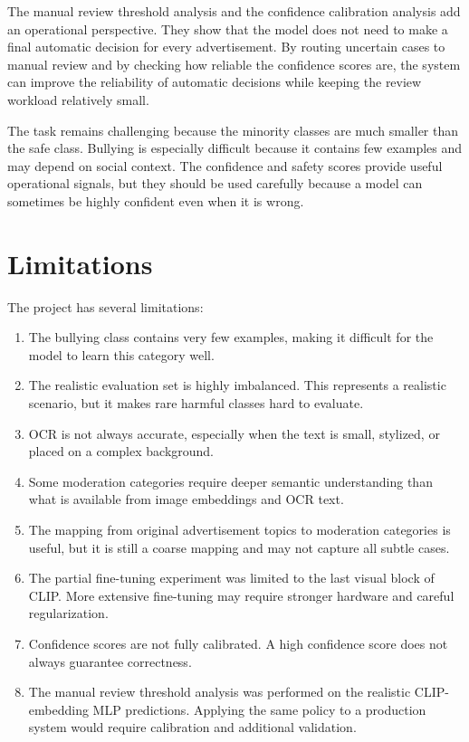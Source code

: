 \documentclass[12pt]{article}
\begin{document}
The manual review threshold analysis and the confidence calibration analysis add an operational perspective. They show that the model does not need to make a final automatic decision for every advertisement. By routing uncertain cases to manual review and by checking how reliable the confidence scores are, the system can improve the reliability of automatic decisions while keeping the review workload relatively small.

The task remains challenging because the minority classes are much smaller than the safe class. Bullying is especially difficult because it contains few examples and may depend on social context. The confidence and safety scores provide useful operational signals, but they should be used carefully because a model can sometimes be highly confident even when it is wrong.

\section{Limitations}

The project has several limitations:
\begin{enumerate}
    \item The bullying class contains very few examples, making it difficult for the model to learn this category well.
    \item The realistic evaluation set is highly imbalanced. This represents a realistic scenario, but it makes rare harmful classes hard to evaluate.
    \item OCR is not always accurate, especially when the text is small, stylized, or placed on a complex background.
    \item Some moderation categories require deeper semantic understanding than what is available from image embeddings and OCR text.
    \item The mapping from original advertisement topics to moderation categories is useful, but it is still a coarse mapping and may not capture all subtle cases.
    \item The partial fine-tuning experiment was limited to the last visual block of CLIP. More extensive fine-tuning may require stronger hardware and careful regularization.
    \item Confidence scores are not fully calibrated. A high confidence score does not always guarantee correctness.
    \item The manual review threshold analysis was performed on the realistic CLIP-embedding MLP predictions. Applying the same policy to a production system would require calibration and additional validation.
\end{enumerate}
\end{document}
